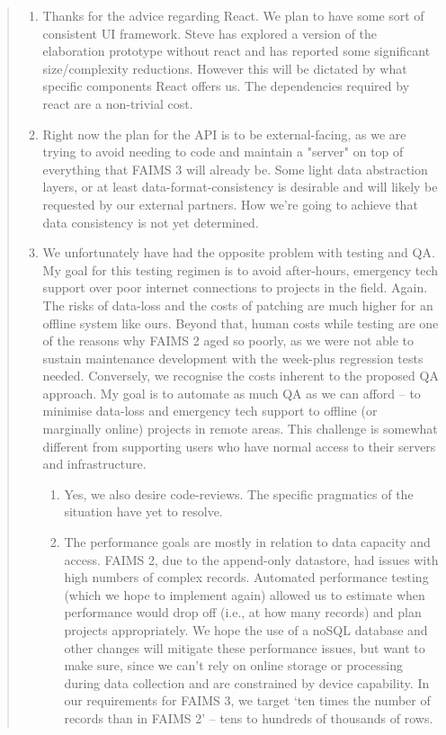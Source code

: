 \documentclass{faims3_report}
\begin{document}
\begin{quote}
\begin{enumerate}[itemsep=1em]
\item Thanks for the advice regarding React. We plan to have some sort of
  consistent UI framework. Steve has explored a version of the
  elaboration prototype without react and has reported some significant
  size/complexity reductions. However this will be dictated by what
  specific components React offers us. The dependencies required by react
  are a non-trivial cost.
 
\item Right now the plan for the API is to be external-facing, as we
  are trying to avoid needing to code and maintain a "server" on top of
  everything that FAIMS 3 will already be. Some light data abstraction
  layers, or at least data-format-consistency is desirable and
  will likely be requested by our external partners. How we're going to
  achieve that data consistency is not yet determined.
 
\item We unfortunately have had the opposite problem with testing and QA. 
  My goal for this testing regimen is to avoid after-hours, emergency tech 
  support over poor internet connections to projects in the field. Again. 
  The risks of data-loss and the costs of patching are much higher for an 
  offline system like ours. Beyond that, human costs while testing are one 
  of the reasons why FAIMS 2 aged so poorly, as we were not able to sustain 
  maintenance development with the week-plus regression tests needed. 
  Conversely, we recognise the costs inherent to the proposed QA approach. 
  My goal is to automate as much QA as we can afford -- to minimise data-loss and
  emergency tech support to offline (or marginally online) projects in remote areas. 
  This challenge is somewhat different from supporting users who have normal access 
  to their servers and infrastructure.
 

  \begin{enumerate}
  \item Yes, we also desire code-reviews. The specific pragmatics of the
    situation have yet to resolve.
   
  \item The performance goals are mostly in relation to data capacity and
    access. FAIMS 2, due to the append-only datastore, had issues with
    high numbers of complex records. Automated performance testing (which we hope 
    to implement again) allowed us to estimate when performance would drop off 
    (i.e., at how many records) and plan projects appropriately. We hope the use 
    of a noSQL database and other changes 
    will mitigate these performance issues, but want to make sure, since we can't 
    rely on online storage or processing during data collection and are constrained by device capability.
    In our requirements for FAIMS 3, we target `ten times the number of records than in FAIMS 2' 
    -- tens to hundreds of thousands of rows. 
    

\end{enumerate}
\end{enumerate}
\end{quote}
\end{document}

